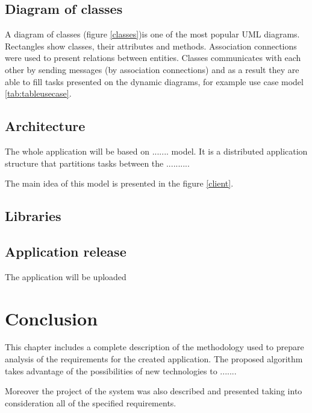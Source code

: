 \subsection{Diagram of classes}
A diagram of classes (figure \ref{classes})is one of the most popular UML diagrams. Rectangles show classes, their attributes and methods. Association connections were used to present relations between entities. Classes communicates with each other by sending messages (by association connections) and as a result they are able to fill tasks presented on the dynamic diagrams, for example use case model \ref{tab:tableusecase}.

 
  

\subsection{Architecture}
The whole application will be based on ....... model. It is a distributed application structure that partitions tasks between the ..........


The main idea of this model is presented in the figure \ref{client}.
 
 
 
 
\subsection{Libraries}



\subsection{Application release}
The application will be uploaded 



\section{Conclusion}
This chapter includes a complete description of the methodology used to prepare analysis of the requirements for the created application. The proposed algorithm takes advantage of the possibilities of new technologies to .......

Moreover the project of the system was also described and presented taking into consideration all of the specified requirements.